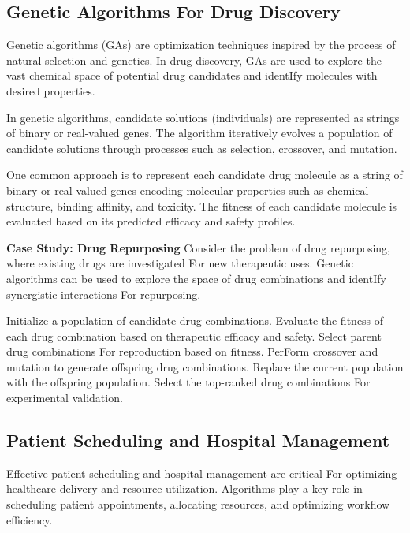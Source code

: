 \documentclass[12pt]{book} %
\begin{document}
\subsection{Genetic Algorithms For Drug Discovery}
Genetic algorithms (GAs) are optimization techniques inspired by the process of natural selection and genetics. In drug discovery, GAs are used to explore the vast chemical space of potential drug candidates and identIfy molecules with desired properties.

In genetic algorithms, candidate solutions (individuals) are represented as strings of binary or real-valued genes. The algorithm iteratively evolves a population of candidate solutions through processes such as selection, crossover, and mutation.

One common approach is to represent each candidate drug molecule as a string of binary or real-valued genes encoding molecular properties such as chemical structure, binding affinity, and toxicity. The fitness of each candidate molecule is evaluated based on its predicted efficacy and safety profiles.

\textbf{Case Study: Drug Repurposing}
Consider the problem of drug repurposing, where existing drugs are investigated For new therapeutic uses. Genetic algorithms can be used to explore the space of drug combinations and identIfy synergistic interactions For repurposing.
\FloatBarrier
\begin{algorithm}
\caption{Genetic Algorithm For Drug Repurposing}
\begin{algorithmic}[1]
\State Initialize a population of candidate drug combinations.
    \State Evaluate the fitness of each drug combination based on therapeutic efficacy and safety.
    \State Select parent drug combinations For reproduction based on fitness.
    \State PerForm crossover and mutation to generate offspring drug combinations.
    \State Replace the current population with the offspring population.
\EndFor
\State Select the top-ranked drug combinations For experimental validation.
\end{algorithmic}
\end{algorithm}
\FloatBarrier
\subsection{Patient Scheduling and Hospital Management}
Effective patient scheduling and hospital management are critical For optimizing healthcare delivery and resource utilization. Algorithms play a key role in scheduling patient appointments, allocating resources, and optimizing workflow efficiency.
\end{document}
